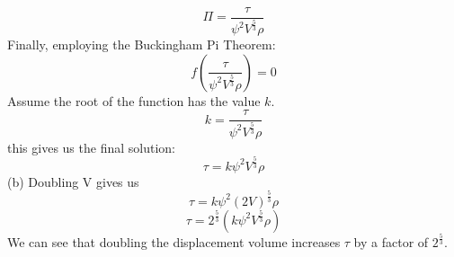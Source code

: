 \documentclass[11pt,answers]{exam}
\begin{document}
\begin{questions}
\begin{solution}
\begin{equation*}
\Pi = \frac{\tau}{ \psi^{2} V^{\frac{5}{3}} \rho}
\end{equation*}
Finally, employing the Buckingham Pi Theorem:
\begin{equation*}
f(\frac{\tau}{ \psi^{2} V^{\frac{5}{3}} \rho}) = 0
\end{equation*}
Assume the root of the function has the value $k$.
\begin{equation*}
k = \frac{\tau}{ \psi^{2} V^{\frac{5}{3}} \rho}
\end{equation*}
this gives us the final solution:
\begin{equation*}
\tau = k\psi^{2} V^{\frac{5}{3}} \rho 
\end{equation*}
(b) Doubling V gives us
\begin{equation*}
\tau = k\psi^{2} (2V)^{\frac{5}{3}} \rho 
\end{equation*}
\begin{equation*}
\tau = 2^{\frac{5}{3}}(k\psi^{2} V^{\frac{5}{3}} \rho)
\end{equation*}
We can see that doubling the displacement volume increases $\tau$ by a factor of $2^{\frac{5}{3}}$.
\end{solution}


\end{questions}
\end{document}
